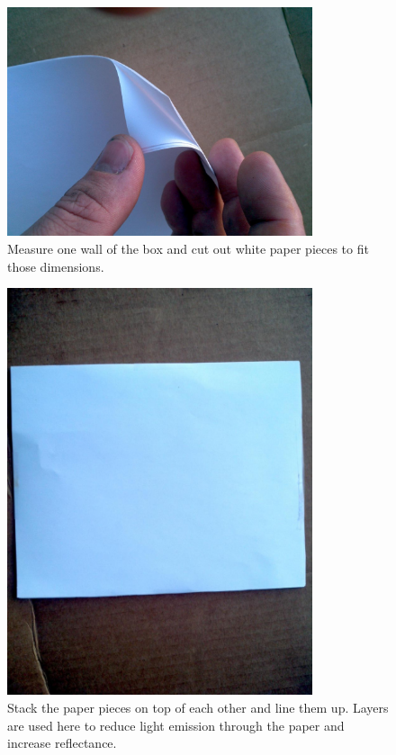 \documentclass[13pt]{article}
\begin{document}
\begin{figure}[ht!]
\centering
\includegraphics[width=0.8\textwidth]{eps/paperLayer.eps}
\caption{Measure one wall of the box and cut out white paper pieces to fit those dimensions.}
\end{figure}

\begin{figure}[ht!]
\centering
\includegraphics[width=0.8\textwidth]{eps/layersAligned.eps}
\caption{Stack the paper pieces on top of each other and line them up. Layers are used here to reduce light emission through the paper and increase reflectance.}
\end{figure}
\end{document}
